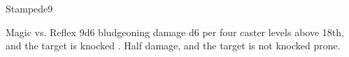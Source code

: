 \begin{spellsection}{Stampede}{9}
\begin{spellheader}
    \begin{spelltargetinginfo}
    \end{spelltargetinginfo}
\end{spellheader}
\begin{spellcontent}
    \begin{spelleffects}
        \begin{spellattack}{Magic vs. Reflex}
            \spellsuccess 9d6 bludgeoning damage \add d6 per four caster levels above 18th, and the target is knocked \prone.
            \spellfailure Half damage, and the target is not knocked prone.
        \end{spellattack}
        \spelldur \durshort \dismissable
    \end{spelleffects}
\end{spellcontent}
\begin{spellfooter}
\end{spellfooter}
\end{spellsection}

